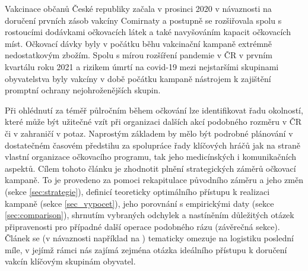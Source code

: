 Vakcinace občanů České republiky začala v prosinci 2020 v návaznosti na doručení prvních zásob vakcíny Comirnaty a postupně se rozšiřovala spolu s rostoucími dodávkami očkovacích látek a také navyšováním kapacit očkovacích míst. %
%
Očkovací dávky byly v počátku běhu vakcinační kampaně extrémně nedostatkovým zbožím. Spolu s mírou rozšíření pandemie v ČR v prvním kvartálu roku 2021 a rizikem úmrtí na covid-19 mezi nejstaršími skupinami obyvatelstva byly vakcíny v době počátku kampaně nástrojem k zajištění promptní ochrany nejohroženějších skupin. %

Při ohlédnutí za téměř půlročním během očkování lze identifikovat řadu okolností, které může být užitečné vzít při organizaci dalších akcí podobného rozměru v ČR či v zahraničí v potaz. Naprostým základem by mělo být podrobné plánování v dostatečném časovém předstihu za spolupráce řady klíčových hráčů jak na straně vlastní organizace očkovacího programu, tak jeho medicínských i komunikačních aspektů. 
%
Cílem tohoto článku je zhodnotit plnění strategických záměrů očkovací kampaně. To je provedeno za pomoci rekapitulace původního záměru a jeho změn (sekce \ref{sec:strategie}), definicí teoreticky optimálního přístupu k realizaci kampaně (sekce \ref{sec_vypocet}), jeho porovnání s empirickými daty (sekce \ref{sec:comparison}), shrnutím vybraných odchylek a nastíněním důležitých otázek připravenosti pro případné další operace podobného rázu (závěrečná sekce).
%
Článek se (v návaznosti například na \cite{lastmile}) tematicky omezuje na logistiku poslední míle, v jejímž rámci nás zajímá zejména otázka ideálního přístupu k doručení vakcín klíčovým skupinám obyvatel.



